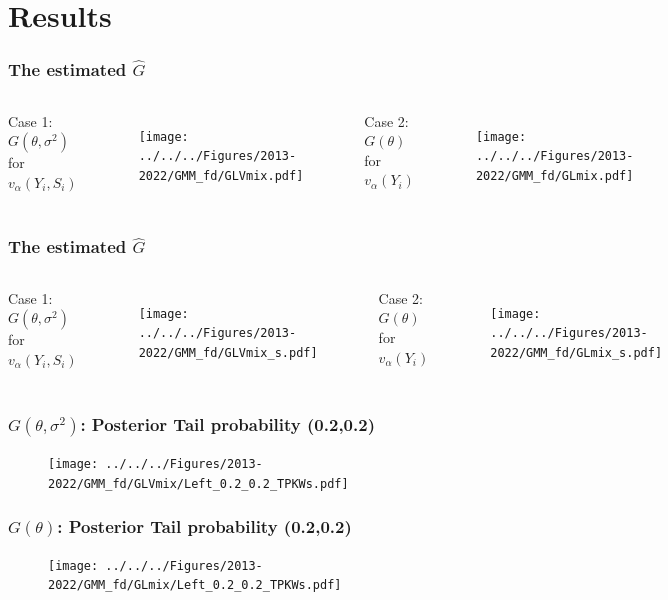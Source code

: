 \documentclass[10pt, aspectratio=169]{beamer}
\begin{document}
\section{Results}
\begin{frame}
  \frametitle{The estimated $\hat{G}$}
  \begin{columns}[T,onlytextwidth]
    Case 1: $G(\theta,\sigma^2)$ for $v_\alpha(Y_i,S_i)$
    \begin{figure}
      \centering
      \texttt{[image: ../../../Figures/2013-2022/GMM\_fd/GLVmix.pdf]}
    \end{figure}

    Case 2: $G(\theta)$ for $v_\alpha(Y_i)$
    \begin{figure}
      \centering
      \texttt{[image: ../../../Figures/2013-2022/GMM\_fd/GLmix.pdf]}
    \end{figure}
  \end{columns}
\end{frame}

\begin{frame}
  \frametitle{The estimated $\hat{G}$}
  \begin{columns}[T,onlytextwidth]
    Case 1: $G(\theta,\sigma^2)$ for $v_\alpha(Y_i,S_i)$
    \begin{figure}
      \centering
      \texttt{[image: ../../../Figures/2013-2022/GMM\_fd/GLVmix\_s.pdf]}
    \end{figure}

    Case 2: $G(\theta)$ for $v_\alpha(Y_i)$
    \begin{figure}
      \centering
      \texttt{[image: ../../../Figures/2013-2022/GMM\_fd/GLmix\_s.pdf]}
    \end{figure}
  \end{columns}
\end{frame}

\begin{frame}
  \frametitle{$G(\theta,\sigma^2)$: Posterior Tail probability (0.2,0.2)}
  \begin{figure}
    \centering
    \texttt{[image: ../../../Figures/2013-2022/GMM\_fd/GLVmix/Left\_0.2\_0.2\_TPKWs.pdf]}
  \end{figure}
\end{frame}

\begin{frame}
  \frametitle{$G(\theta)$: Posterior Tail probability (0.2,0.2)}
  \begin{figure}
    \centering
    \texttt{[image: ../../../Figures/2013-2022/GMM\_fd/GLmix/Left\_0.2\_0.2\_TPKWs.pdf]}
  \end{figure}
\end{frame}
\end{document}
